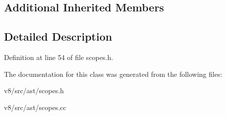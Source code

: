 \subsection*{Additional Inherited Members}


\subsection{Detailed Description}


Definition at line 54 of file scopes.\+h.



The documentation for this class was generated from the following files\+:\begin{DoxyCompactItemize}
\item 
v8/src/ast/scopes.\+h\item 
v8/src/ast/scopes.\+cc\end{DoxyCompactItemize}
